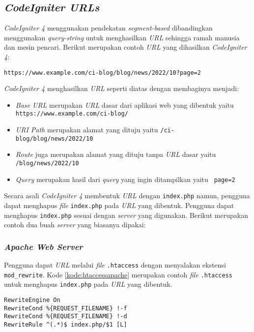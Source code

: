 \subsection{\textit{CodeIgniter URLs}}
\textit{CodeIgniter 4} menggunakan pendekatan \textit{segment-based} dibandingkan menggunakan \textit{query-string} untuk menghasilkan \textit{URL} sehingga ramah manusia dan mesin pencari. Berikut merupakan contoh \textit{URL} yang dihasilkan \textit{CodeIgniter 4}:

\begin{center}
\texttt{https://www.example.com/ci-blog/blog/news/2022/10?page=2}
\end{center}

\textit{CodeIgniter 4} menghasilkan \textit{URL} seperti diatas dengan membaginya menjadi:

\begin{itemize}
\item \textit{Base URL} merupakan \textit{URL} dasar dari aplikasi web yang dibentuk yaitu \texttt{	
https://www.example.com/ci-blog/}
\item \textit{URI Path} merupakan alamat yang dituju yaitu \texttt{/ci-blog/blog/news/2022/10} 
\item \textit{Route} juga merupakan alamat yang dituju tanpa \textit{URL} dasar yaitu \texttt{/blog/news/2022/10} 
\item \textit{Query} merupakan hasil dari \textit{query} yang ingin ditampilkan yaitu \texttt{	
page=2}
\end{itemize}

Secara asali \textit{CodeIgniter 4} membentuk \textit{URL} dengan \verb|index.php| namun, pengguna dapat menghapus \textit{file} \verb|index.php| pada \textit{URL} yang dibentuk. Pengguna dapat menghapus \verb|index.php| sesuai dengan \textit{server} yang digunakan. Berikut merupakan contoh dua buah \textit{server} yang biasanya dipakai:

\subsubsection{\textit{Apache Web Server}}
Pengguna dapat \textit{URL} melalui \textit{file} \verb|.htaccess| dengan menyalakan ekstensi \verb|mod_rewrite|. Kode \ref{kode:htaccessapache} merupakan contoh \textit{file} \verb|.htaccess| untuk menghapus \verb|index.php| pada \textit{URL} yang dibentuk.

\begin{lstlisting}[caption=Contoh \textit{file} \texttt{.htacess} pada \textit{Apache Web Server}. ,label=kode:htaccessapache]
RewriteEngine On
RewriteCond %{REQUEST_FILENAME} !-f
RewriteCond %{REQUEST_FILENAME} !-d
RewriteRule ^(.*)$ index.php/$1 [L]
\end{lstlisting}

